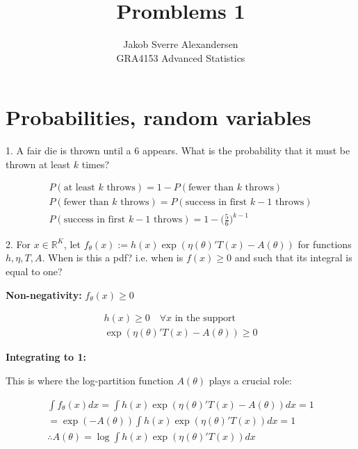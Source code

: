 \documentclass[10pt]{article}
\begin{document}
 
\title{Promblems 1}
\author{Jakob Sverre Alexandersen\\
GRA4153 Advanced Statistics}
\maketitle

\tableofcontents
\newpage

\section{Probabilities, random variables}

1. A fair die is thrown until a 6 appears. What is the probability that 
it must be thrown at least $k$ times?

\begin{align*}
    P(\text{at least $k$ throws}) = 1 - P(\text{fewer than $k$ throws}) \\
    P(\text{fewer than $k$ throws}) = P(\text{success in first $k-1$ throws}) \\
    P(\text{success in first $k-1$ throws}) = 1 - \Big(\frac{5}{6}\Big)^{k - 1}
\end{align*}

\hfill 

2. For $x \in \mathbb{R}^K$, let $f_\theta(x) :=h(x) \exp(\eta(\theta)'T(x) - A(\theta))$ for functions $h, \eta, T, A$. When 
is this a pdf? i.e. when is $f(x) \geq 0$ and such that its integral is equal to one?

\textbf{Non-negativity: } $f_\theta(x) \geq 0$

\begin{align*}
    h(x) \geq 0 \quad\forall x \text{ in the support}\\
    \exp(\eta(\theta)'T(x) - A(\theta)) \geq 0
\end{align*}

\textbf{Integrating to 1: }

This is where the log-partition function $A(\theta)$ plays a crucial role:

\begin{align*}
    \int f_\theta(x) dx = \int h(x) \exp (\eta(\theta)'T(x) - A(\theta)) dx = 1\\
    = \exp(-A(\theta)) \int h(x) \exp(\eta(\theta)'T(x)) dx = 1 \\
    \therefore A(\theta) = \log \int h(x) \exp(\eta(\theta)'T(x)) dx
\end{align*}

\newpage
\end{document}
